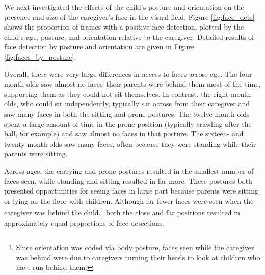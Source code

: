 \documentclass[10pt,letterpaper]{article}
\begin{document}
We next investigated the effects of the child's posture and orientation on the presence and size of the caregiver's face in the visual field. Figure \ref{fig:face_dets} shows the proportion of frames with a positive face detection, plotted by the child's age, posture, and orientation relative to the caregiver. 
Detailed results of face detection by posture and orientation are given in Figure \ref{fig:faces_by_posture}.

Overall, there were very large differences in access to faces across age. The four-month-olds saw almost no faces--their parents were behind them most of the time, supporting them as they could not sit themselves. In contrast, the eight-month-olds, who could sit independently, typically sat across from their caregiver and saw many faces in both the sitting and prone postures. The twelve-month-olds spent a large amount of time in the prone position (typically crawling after the ball, for example) and saw almost no faces in that posture. The sixteen- and twenty-month-olds saw many faces, often because they were standing while their parents were sitting.

Across ages, the carrying and prone postures resulted in the smallest number of faces seen, while standing and sitting resulted in far more. These postures both presented opportunities for seeing faces in large part because parents were sitting or lying on the floor with children. Although far fewer faces were seen when the caregiver was behind the child,\footnote{Since orientation was coded via body posture, faces seen while the caregiver was behind were due to caregivers turning their heads to look at children who have run behind them.} both the close and far positions resulted in approximately equal proportions of face detections. 




\end{document}
